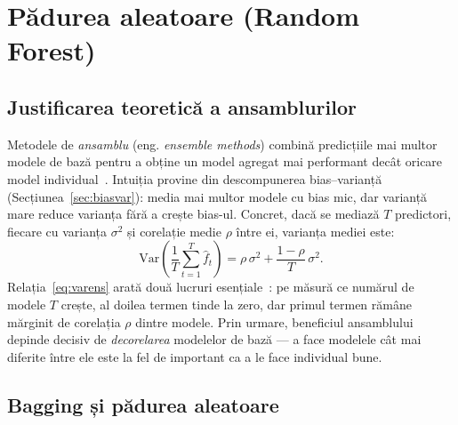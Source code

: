 \documentclass[12pt,a4paper]{report}
\begin{document}
\section{Pădurea aleatoare (Random Forest)}
\label{sec:forest}

\subsection{Justificarea teoretică a ansamblurilor}

Metodele de \emph{ansamblu} (eng. \emph{ensemble methods}) combină predicțiile mai multor modele
de bază pentru a obține un model agregat mai performant decât oricare model
individual~\cite{dietterich2000ensemble}. Intuiția provine din descompunerea bias--varianță
(Secțiunea~\ref{sec:biasvar}): media mai multor modele cu bias mic, dar varianță mare reduce
varianța fără a crește bias-ul. Concret, dacă se mediază $T$ predictori, fiecare cu varianța
$\sigma^2$ și corelație medie $\rho$ între ei, varianța mediei este:
\begin{equation}
  \text{Var}\!\left(\frac{1}{T}\sum_{t=1}^{T} \hat{f}_t\right) =
  \rho\,\sigma^2 + \frac{1 - \rho}{T}\,\sigma^2 .
  \label{eq:varens}
\end{equation}
Relația~\eqref{eq:varens} arată două lucruri esențiale~\cite{hastie2009elements}: pe măsură ce
numărul de modele $T$ crește, al doilea termen tinde la zero, dar primul termen rămâne mărginit
de corelația $\rho$ dintre modele. Prin urmare, beneficiul ansamblului depinde decisiv de
\emph{decorelarea} modelelor de bază --- a face modelele cât mai diferite între ele este la fel
de important ca a le face individual bune.

\subsection{Bagging și pădurea aleatoare}
\end{document}
